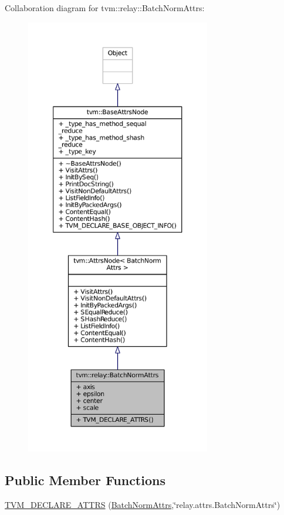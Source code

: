 Collaboration diagram for tvm\+:\+:relay\+:\+:Batch\+Norm\+Attrs\+:
\nopagebreak
\begin{figure}[H]
\begin{center}
\leavevmode
\includegraphics[height=550pt]{structtvm_1_1relay_1_1BatchNormAttrs__coll__graph}
\end{center}
\end{figure}
\subsection*{Public Member Functions}
\begin{DoxyCompactItemize}
\item 
\hyperlink{structtvm_1_1relay_1_1BatchNormAttrs_a485b2c49acb6785fb00741ee626800be}{T\+V\+M\+\_\+\+D\+E\+C\+L\+A\+R\+E\+\_\+\+A\+T\+T\+RS} (\hyperlink{structtvm_1_1relay_1_1BatchNormAttrs}{Batch\+Norm\+Attrs},\char`\"{}relay.\+attrs.\+Batch\+Norm\+Attrs\char`\"{})
\end{DoxyCompactItemize}
